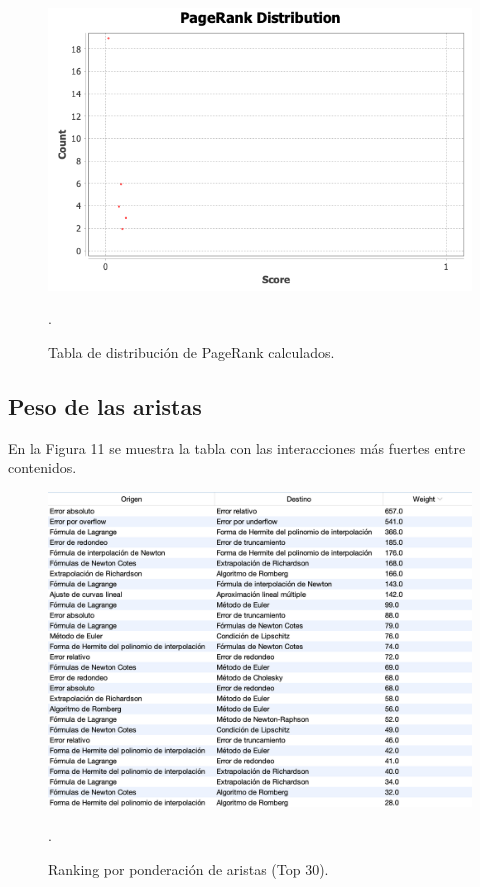 \documentclass[a4paper,10pt,twocolumn]{article}
\begin{document}
        \begin{figure}[h!]
            \centering
            \includegraphics[scale=0.35]{pageranks.png}
            \caption{Tabla de distribución de PageRank calculados. \label{fig:ex}}
.        \end{figure}

        \subsection{Peso de las aristas}

        En la Figura 11 se muestra la tabla con las interacciones más fuertes entre contenidos.
        
        \begin{figure}[h!]
            \centering
            \includegraphics[scale=0.35]{weighted_edges.png}
            \caption{Ranking por ponderación de aristas (Top 30). \label{fig:ex}}
.        \end{figure}
\end{document}
